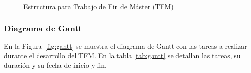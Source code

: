 \begin{landscape}
\begin{figure}
\begin{tikzpicture}
\end{tikzpicture}
\vspace{10pt}
\caption{Estructura para Trabajo de Fin de Máster (TFM)}
\label{fig:tfg_structure}
\end{figure}
\end{landscape}
\restoregeometry

\subsubsection{Diagrama de Gantt}\label{sec:gantt}

En la Figura~\ref{fig:gantt} se muestra el diagrama de Gantt con las tareas a realizar durante el desarrollo del TFM. En la tabla \ref{tab:gantt} se detallan las tareas, su duración y su fecha de inicio y fin.


